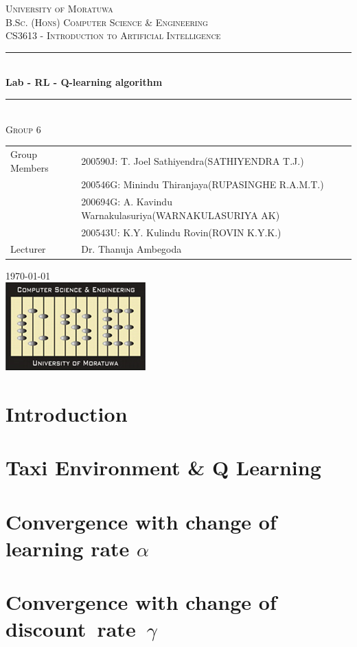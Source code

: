 \documentclass[11pt]{article}
\begin{document}
\begin{titlepage}

\newcommand{\HRule}{\rule{\linewidth}{0.5mm}} 

\center 

\textsc{\LARGE University of Moratuwa}\\[1.5cm] 

\textsc{\Large  B.Sc. (Hons) Computer Science \& Engineering}\\[0.5cm] 
\textsc{\large CS3613 - Introduction to Artificial Intelligence}\\[0.5cm] 

\HRule \\[0.4cm]
{ \huge \bfseries Lab - RL - Q-learning algorithm}\\[0.4cm] 

\HRule \\[1.5cm]

\textsc{\LARGE Group 6}\\[1.5cm] %
\noindent\begin{tabular}{@{}ll}
    Group Members & 200590J: T. Joel Sathiyendra(SATHIYENDRA T.J.)\\
    & 200546G: Minindu Thiranjaya(RUPASINGHE R.A.M.T.)  \\
    & 200694G: A. Kavindu Warnakulasuriya(WARNAKULASURIYA AK) \\
    & 200543U: K.Y. Kulindu Rovin(ROVIN K.Y.K.)  \\[.5cm]
     Lecturer &  Dr. Thanuja Ambegoda\\[.5cm]
\end{tabular}

{\large \today}\\[2cm] 

\includegraphics{CSE_logo.png}\\[1cm] 

\vfill %

\end{titlepage}

\section*{Introduction}

\section*{Taxi Environment \& Q Learning}

\section*{Convergence with change of learning rate $\alpha $}

\section*{Convergence with change of discount rate $\gamma $}
\end{document}

